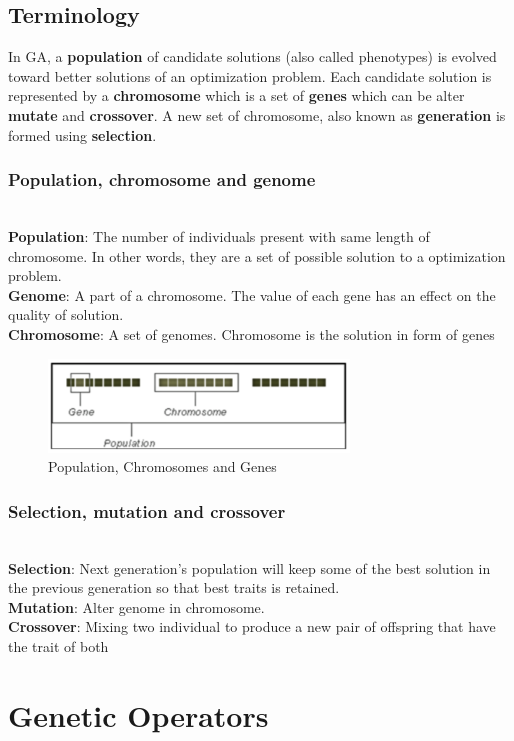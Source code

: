 \documentclass[conference]{IEEEtran}
\begin{document}
\subsection{Terminology}
In GA, a \textbf{population} of candidate solutions (also called phenotypes) is evolved toward better solutions of an optimization problem. Each candidate solution is represented by a \textbf{chromosome} which is a set of \textbf{genes} which can be alter \textbf{mutate} and \textbf{crossover}. A new set of chromosome, also known as \textbf{generation} is formed using \textbf{selection}.
\subsubsection{Population, chromosome and genome}
~\\
\textbf{Population}: The number of individuals present with same length of chromosome. In other words, they are a set of possible solution to a optimization problem.\\
\textbf{Genome}: A part of a chromosome. The value of each gene has an effect on the quality of solution.\\
\textbf{Chromosome}: A set of genomes. Chromosome is the solution in form of genes
\begin{figure}[H]
    \centering
    \includegraphics[width=8cm]{gene_definition}
    \caption{Population, Chromosomes and Genes}
    \label{fig:fig2}
\end{figure}
\subsubsection{Selection, mutation and crossover}
~\\
\textbf{Selection}: Next generation's population will keep some of the best solution in the previous generation so that best traits is retained.\\
\textbf{Mutation}: Alter genome in chromosome.\\
\textbf{Crossover}: Mixing two individual to produce a new pair of offspring that have the trait of both 
\section{Genetic Operators}
\end{document}
